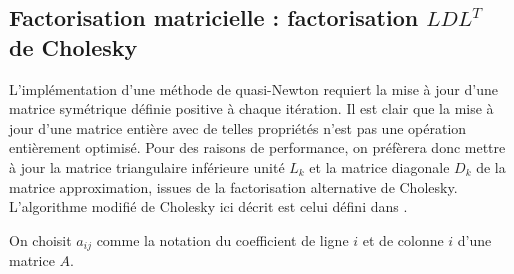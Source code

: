 \documentclass[3p, twocolumn]{elsarticle}
\begin{document}
\subsection{Factorisation matricielle : factorisation $LDL^T$ de Cholesky}
L'implémentation d'une méthode de quasi-Newton requiert la mise à jour d'une matrice symétrique définie positive à chaque itération. Il est clair que la mise à jour d'une matrice entière avec de telles propriétés n'est pas une opération entièrement optimisé. Pour des raisons de performance, on préfèrera donc mettre à jour la matrice triangulaire inférieure unité $L_k$ et la matrice diagonale $D_k$ de la matrice approximation, issues de la factorisation alternative de Cholesky. L'algorithme modifié de Cholesky ici décrit est celui défini dans \cite{art:McSweeney_2017}.

\begin{rmk}
    On choisit $a_{ij}$ comme la notation du coefficient de ligne $i$ et de colonne $i$ d'une matrice $A$.
\end{rmk}
\end{document}

